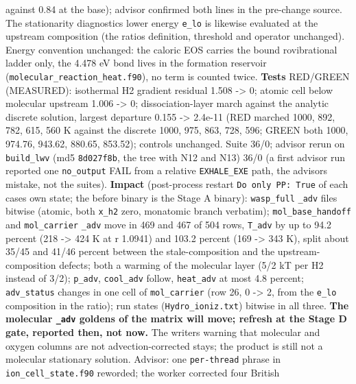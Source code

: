 \documentclass[english,a4paper]{my_memo}
\begin{document}
\begin{itemize}
  against 0.84 at the base); advisor confirmed both lines in the pre-change
  source. The stationarity diagnostic\textquotesingle s lower energy \texttt{e\_lo} is likewise
  evaluated at the upstream composition (the ratio\textquotesingle s definition, threshold
  and operator unchanged). Energy convention unchanged: the caloric EOS
  carries the bound rovibrational ladder only, the 4.478 eV bond lives in
  the formation reservoir (\texttt{molecular\_reaction\_heat.f90}), no term is
  counted twice. \textbf{Tests} RED/GREEN (MEASURED): isothermal H2 gradient
  residual 1.508 -\textgreater{} 0; atomic cell below molecular upstream 1.006 -\textgreater{} 0;
  dissociation-layer march against the analytic discrete solution, largest
  departure 0.155 -\textgreater{} 2.4e-11 (RED marched 1000, 892, 782, 615, 560 K
  against the discrete 1000, 975, 863, 728, 596; GREEN both 1000, 974.76,
  943.62, 880.65, 853.52); controls unchanged. Suite 36/0; advisor rerun on
  \texttt{build\_lwv} (md5 \texttt{8d027f8b}, the tree with N12 and N13) 36/0 (a first
  advisor run reported one \texttt{no\_output} FAIL from a relative \texttt{EXHALE\_EXE}
  path, the advisor\textquotesingle s mistake, not the suite\textquotesingle s). \textbf{Impact} (post-process
  restart \texttt{Do\ only\ PP:\ True} of each case\textquotesingle s own state; the before binary is
  the Stage A binary): \texttt{wasp\_full} \texttt{\_adv} files bitwise (atomic, both
  \texttt{x\_h2} zero, monatomic branch verbatim); \texttt{mol\_base\_handoff} and
  \texttt{mol\_carrier} \texttt{\_adv} move in 469 and 467 of 504 rows, \texttt{T\_adv} by up to
  94.2 percent (218 -\textgreater{} 424 K at r 1.0941) and 103.2 percent (169 -\textgreater{} 343 K),
  split about 35/45 and 41/46 percent between the stale-composition and the
  upstream-composition defects; both a warming of the molecular layer (5/2
  kT per H2 instead of 3/2); \texttt{p\_adv}, \texttt{cool\_adv} follow, \texttt{heat\_adv} at
  most 4.8 percent; \texttt{adv\_status} changes in one cell of \texttt{mol\_carrier} (row
  26, 0 -\textgreater{} 2, from the \texttt{e\_lo} composition in the ratio); run states
  (\texttt{Hydro\_ioniz.txt}) bitwise in all three. \textbf{The molecular \texttt{\_adv} goldens
  of the matrix will move; refresh at the Stage D gate, reported then, not
  now.} The writer\textquotesingle s warning that molecular and oxygen columns are not
  advection-corrected stays; the product is still not a molecular
  stationary solution. Advisor: one \texttt{per-thread} phrase in
  \texttt{ion\_cell\_state.f90} reworded; the worker corrected four British

\end{itemize}
\end{document}
